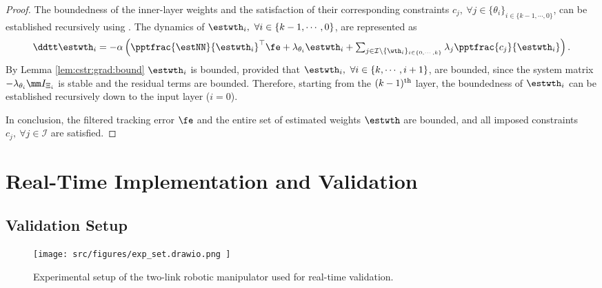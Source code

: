 \documentclass[lettersize,journal]{IEEEtran}
\begin{document}
\begin{proof}
\hfill 

The boundedness of the inner-layer weights and the satisfaction of their corresponding constraints $c_j,\ \forall j\in\{\theta_i\}_{i\in\{k-1,\cdots,0\}}$, can be established recursively using \cite[Chap.~4 Thm.~1.9]{Desoer:2009aa}.
The dynamics of $\estwth_i,\ \forall i\in\{k-1,\cdots,0\}$, are represented as
\begin{equation}
    \ddtt \estwth_i 
    =
    -\alpha
    \left(
        \pptfrac{\estNN}{\estwth_i}^\top
        \fe
        +
        \lambda_{\theta_i}\estwth_i
        +
        \textstyle\sum_{
            j\in\mathcal{I}\setminus \{\wth_i\}_{i\in\{0,\cdots,k\}}
        }
        \lambda_j
        \pptfrac{c_j}{\estwth_i}
    \right)
    .
\end{equation}
By Lemma \ref{lem:cstr:grad:bound} $\estwth_i$ is bounded, provided that $\estwth_i,\ \forall i\in\{k,\cdots,i+1\}$, are bounded, since the system matrix $-\lambda_{\theta_i} \mm I_{\Xi_i}$ is stable and the residual terms are bounded.
Therefore, starting from the $(k-1)\textsuperscript{th}$ layer, the boundedness of $\estwth_i$ can be established recursively down to the input layer ($i=0$).

\hfill

In conclusion, the filtered tracking error $\fe$ and the entire set of estimated weights $\estwth$ are bounded, and all imposed constraints $c_j,\ \forall j\in\mathcal I$ are satisfied.

\end{proof}

\section{Real-Time Implementation and Validation}\label{sec:sim}

\subsection{Validation Setup}

\begin{figure}[t]
    \centering
        \texttt{[image: 
            src/figures/exp\_set.drawio.png
        ]}%
    \caption{
        Experimental setup of the two-link robotic manipulator used for real-time validation.
    }
    \label{fig:ctrl:exp:set}
\end{figure}
\end{document}
